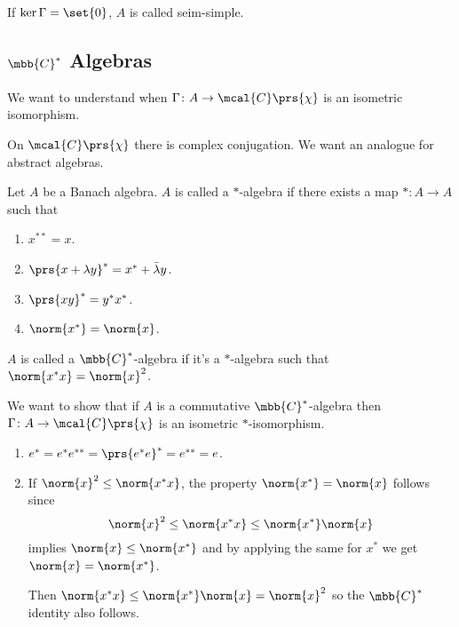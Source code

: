 \documentclass[10pt, twoside]{book}
\begin{document}
\begin{definition}
If $\ker \Gamma = \set{0}$, $A$ is called seim-simple.
\end{definition}

\subsection{$\mbb{C}^*$ Algebras}

We want to understand when $\Gamma \colon A \to \mcal{C}\prs{\chi}$ is an isometric isomorphism.

On $\mcal{C}\prs{\chi}$ there is complex conjugation. We want an analogue for abstract algebras.

\begin{definition}[$*$-Algebra]
Let $A$ be a Banach algebra. $A$ is called a $*$-algebra if there exists a map $* \colon A \to A$ such that
\begin{enumerate}
\item $x^{**} = x$.
\item $\prs{x+\lambda y}^* = x^* + \bar{\lambda} y$.
\item $\prs{xy}^* = y^* x^*$.
\item $\norm{x^*} = \norm{x}$.
\end{enumerate}
\end{definition}

\begin{definition}
$A$ is called a $\mbb{C}^*$-algebra if it's a $*$-algebra such that $\norm{x^* x} = \norm{x}^2$.
\end{definition}

We want to show that if $A$ is a commutative $\mbb{C}^*$-algebra then $\Gamma \colon A \to \mcal{C}\prs{\chi}$ is an isometric $*$-isomorphism.

\begin{remark}
\begin{enumerate}
\item $e^* = e^* e^{**} = \prs{e^* e}^* = e^{**} = e$.
\item If $\norm{x}^2 \leq \norm{x^* x}$, the property $\norm{x^*} = \norm{x}$ follows
since
\[\norm{x}^2 \leq \norm{x^* x} \leq \norm{x^*} \norm{x}\]
implies $\norm{x} \leq \norm{x^*}$ and by applying the same for $x^*$ we get $\norm{x} = \norm{x^*}$.

Then $\norm{x^* x} \leq \norm{x^*} \norm{x} = \norm{x}^2$ so the $\mbb{C}^*$ identity also follows. 
\end{enumerate}
\end{remark}
\end{document}
